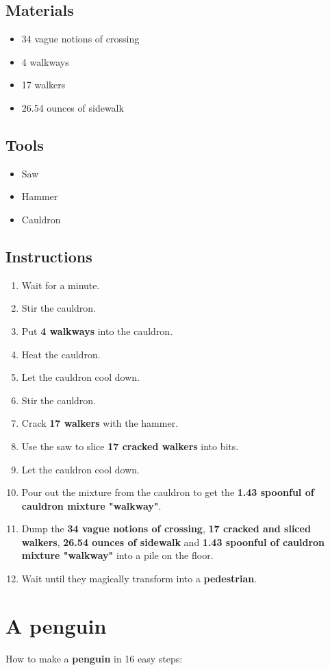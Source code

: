 \documentclass{article}
\begin{document}
\subsection{Materials}\begin{itemize}
\item 
34 vague notions of crossing
\item 
4 walkways
\item 
17 walkers
\item 
26.54 ounces of sidewalk
\end{itemize}
\subsection{Tools}\begin{itemize}
\item 
Saw
\item 
Hammer
\item 
Cauldron
\end{itemize}
\subsection{Instructions}\begin{enumerate}
\item 
Wait for a minute.
\item 
Stir the cauldron.
\item 
Put \textbf{4 walkways} into the cauldron.
\item 
Heat the cauldron.
\item 
Let the cauldron cool down.
\item 
Stir the cauldron.
\item 
Crack \textbf{17 walkers} with the hammer.
\item 
Use the saw to slice \textbf{17 cracked walkers} into bits.
\item 
Let the cauldron cool down.
\item 
Pour out the mixture from the cauldron to get the \textbf{1.43 spoonful of cauldron mixture "walkway"}.
\item 
Dump the \textbf{34 vague notions of crossing}, \textbf{17 cracked and sliced walkers}, \textbf{26.54 ounces of sidewalk} and \textbf{1.43 spoonful of cauldron mixture "walkway"} into a pile on the floor.
\item 
Wait until they magically transform into a \textbf{pedestrian}.
\end{enumerate}
\newpage
\section{A penguin}How to make a \textbf{penguin} in 16 easy steps:
\end{document}
